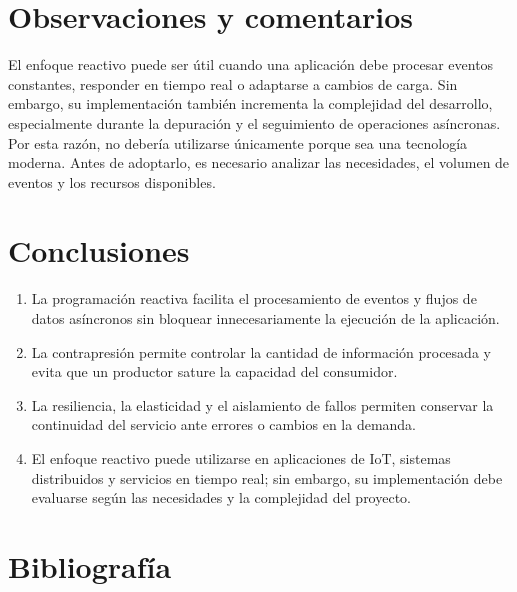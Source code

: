 \documentclass[12pt]{article}
\begin{document}
	\section*{Observaciones y comentarios}
	
	El enfoque reactivo puede ser útil cuando una aplicación debe procesar
	eventos constantes, responder en tiempo real o adaptarse a cambios de
	carga. Sin embargo, su implementación también incrementa la complejidad
	del desarrollo, especialmente durante la depuración y el seguimiento de
	operaciones asíncronas. Por esta razón, no debería utilizarse únicamente
	porque sea una tecnología moderna. Antes de adoptarlo, es necesario
	analizar las necesidades, el volumen de eventos y los recursos disponibles.
	
	\section*{Conclusiones}
	
	\begin{enumerate}
		
		\item La programación reactiva facilita el procesamiento de eventos y
		flujos de datos asíncronos sin bloquear innecesariamente la ejecución
		de la aplicación.
			
		\item La contrapresión permite controlar la cantidad de información
		procesada y evita que un productor sature la capacidad del consumidor.
		
		\item La resiliencia, la elasticidad y el aislamiento de fallos permiten
		conservar la continuidad del servicio ante errores o cambios en la demanda.
		
		\item El enfoque reactivo puede utilizarse en aplicaciones de IoT, sistemas
		distribuidos y servicios en tiempo real; sin embargo, su implementación
		debe evaluarse según las necesidades y la complejidad del proyecto.
		
	\end{enumerate}
	
\section*{Bibliografía}
\end{document}
